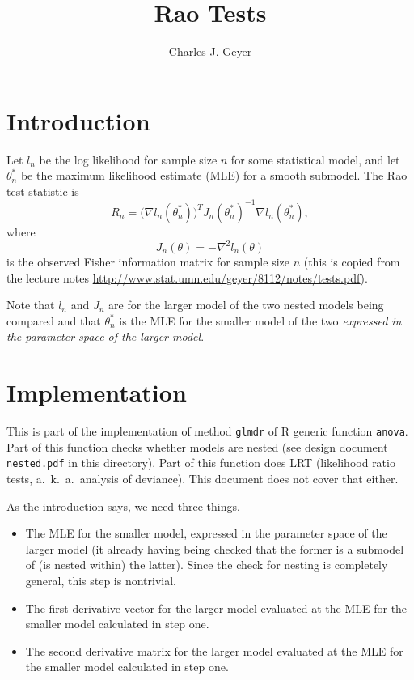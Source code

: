 \documentclass{article}
\begin{document}
\title{Rao Tests}

\author{Charles J. Geyer}

\maketitle

\section{Introduction}

Let $l_n$ be the log likelihood for sample size $n$ for some statistical
model, and let $\theta^*_n$ be the maximum likelihood estimate (MLE)
for a smooth submodel.
The Rao test statistic is
\begin{equation} \label{eq:rao}
   R_n = 
   \bigl(\nabla l_n(\theta^*_n)\bigr)^T J_n(\theta^*_n)^{-1}
   \nabla l_n(\theta^*_n),
\end{equation}
where 
$$
   J_n(\theta) = - \nabla^2 l_n(\theta)
$$
is the observed Fisher information matrix for sample size $n$
(this is copied from the lecture notes
\url{http://www.stat.umn.edu/geyer/8112/notes/tests.pdf}).

Note that $l_n$ and $J_n$ are for the larger model of the two nested
models being compared and that $\theta^*_n$ is the MLE for the smaller
model of the two \emph{expressed in the parameter space of the larger
model}.

\section{Implementation}

This is part of the implementation of method \texttt{glmdr} of R generic
function \texttt{anova}.  Part of this function checks whether models
are nested (see design document \texttt{nested.pdf} in this directory).
Part of this function does LRT (likelihood ratio tests,
a.~k.~a.\ analysis of deviance).  This document does not cover that either.

As the introduction says, we need three things.
\begin{itemize}
\item The MLE for the smaller model, expressed in the parameter space of
the larger model (it already having being checked that the former is a submodel
of (is nested within) the latter).   Since the check for nesting is completely
general, this step is nontrivial.
\item The first derivative vector for the larger model evaluated at the MLE
for the smaller model calculated in step one.
\item The second derivative matrix for the larger model evaluated at the MLE
for the smaller model calculated in step one.
\end{itemize}
\end{document}
